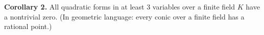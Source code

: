 \textbf{Corollary 2.} All quadratic forms in at least 3 variables over a finite field $K$ have a nontrivial zero. (In geometric language: every conic over a finite field has a rational point.)
